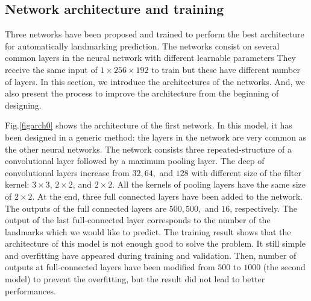 \documentclass[conference]{IEEEtran}
\begin{document}
\subsection{Network architecture and training}
Three networks have been proposed and trained to perform the best architecture for automatically landmarking prediction. The networks consist on several common layers in the neural network with different learnable parameters They receive the same input of $1 \times 256 \times 192$ to train but these have different number of layers. In this section, we introduce the architectures of the networks. And, we also present the process to improve the architecture from the beginning of designing.

Fig.\ref{figarch0} shows the architecture of the first network. In this model, it has been designed in a generic method: the layers in the network are very common as the other neural networks. The network consists three repeated-structure of a convolutional layer followed by a maximum pooling layer. The deep of convolutional layers increase from $32, 64,$ and $128$ with different size of the filter kernel: $3 \times 3$, $2 \times 2$, and $2 \times 2$. All the kernels of pooling layers have the same size of $2 \times 2$.  At the end, three full connected layers have been added to the network. The outputs of the full connected layers are $500, 500,$ and $16$, respectively. The output of the last full-connected layer corresponds to the number of the landmarks which we would like to predict. The training result shows that the architecture of this model is not enough good to solve the problem. It still simple and overfitting have appeared during training and validation. Then, number of outputs at full-connected layers have been modified from $500$ to $1000$ (the second model) to prevent the overfitting, but the result did not lead to better performances. 
\end{document}
